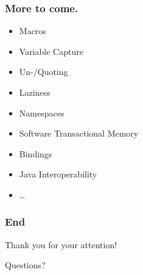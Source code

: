 \documentclass{beamer}
\begin{document}
  \begin{frame}[c]
    \frametitle{More to come.}
    \begin{itemize}
          \item Macros
          \item Variable Capture
          \item Un-/Quoting
          \item Laziness
          \item Namespaces
          \item Software Transactional Memory
          \item Bindings
          \item Java Interoperability
          \item \ldots
    \end{itemize}
  \end{frame}

  \begin{frame}[c]
    \frametitle{End}
    \begin{block}{Thank you for your attention!}
      \pause
      \begin{center}Questions?\end{center}
    \end{block}
  \end{frame}
\end{document}
